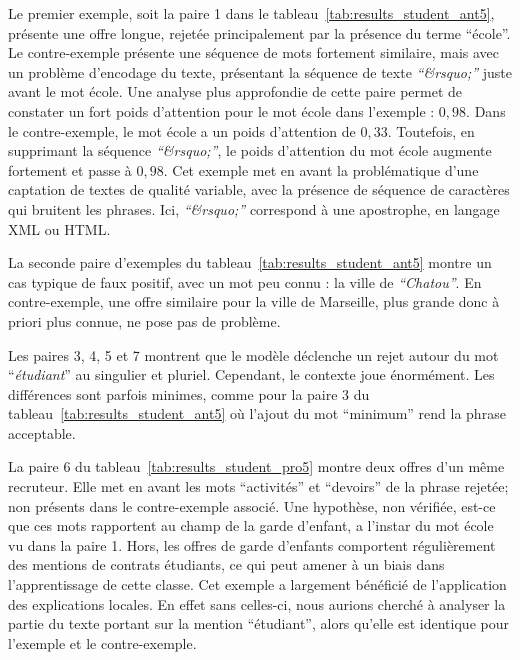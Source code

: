 Le premier exemple, soit la paire 1 dans le tableau~\ref{tab:results_student_ant5}, présente une offre longue, rejetée principalement par la présence du terme ``école''. Le contre-exemple présente une séquence de mots fortement similaire, mais avec un problème d'encodage du texte, présentant la séquence de texte \textit{``\&rsquo;''} juste avant le mot école.
Une analyse plus approfondie de cette paire permet de constater un fort poids d'attention pour le mot école dans l'exemple : $0,98$. Dans le contre-exemple, le mot école a un poids d'attention de $0,33$. Toutefois, en supprimant la séquence \textit{``\&rsquo;''}, le poids d'attention du mot école augmente fortement et passe à $0,98$. Cet exemple met en avant la problématique d'une captation de textes de qualité variable, avec la présence de séquence de caractères qui bruitent les phrases. Ici,  \textit{``\&rsquo;''} correspond à une apostrophe, en langage XML ou HTML.

La seconde paire d'exemples du tableau~\ref{tab:results_student_ant5} montre un cas typique de faux positif, avec un mot peu connu : la ville de \textit{``Chatou''}. En contre-exemple, une offre similaire pour la ville de Marseille, plus grande donc à priori plus connue, ne pose pas de problème.

Les paires 3, 4, 5 et 7 montrent que le modèle déclenche un rejet autour du mot ``\textit{étudiant}'' au singulier et pluriel. Cependant, le contexte joue énormément. Les différences sont parfois minimes, comme pour la paire 3 du tableau~\ref{tab:results_student_ant5} où l'ajout du mot ``minimum'' rend la phrase acceptable.

La paire 6 du tableau~\ref{tab:results_student_pro5} montre deux offres d'un même recruteur. Elle met en avant les mots ``activités'' et ``devoirs'' de la phrase rejetée; non présents dans le contre-exemple associé. Une hypothèse, non vérifiée, est-ce que ces mots rapportent au champ de la garde d'enfant, a l'instar du mot école vu dans la paire 1. Hors, les offres de garde d'enfants comportent régulièrement des mentions de contrats étudiants, ce qui peut amener à un biais dans l'apprentissage de cette classe. Cet exemple a largement bénéficié de l'application des explications locales. En effet sans celles-ci, nous aurions cherché à analyser la partie du texte portant sur la mention ``étudiant'', alors qu'elle est identique pour l'exemple et le contre-exemple.

